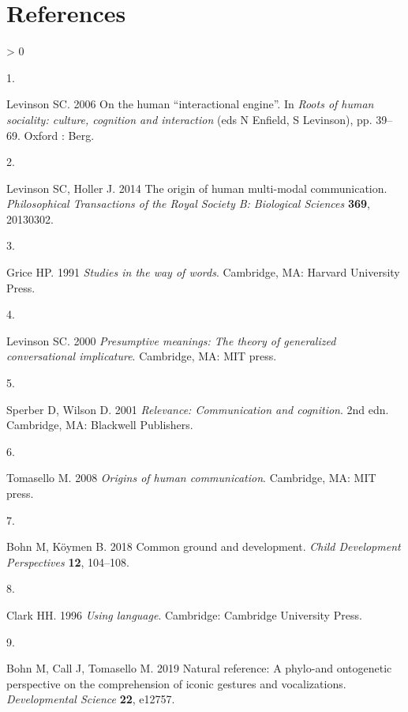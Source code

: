\documentclass[
  english,
  man,floatsintext]{apa6}
\newlength{\cslhangindent}
\newlength{\csllabelwidth}
\newenvironment{CSLReferences}[2] %
 {%
  \setlength{\parindent}{0pt}
  \ifodd #1 \everypar{\setlength{\hangindent}{\cslhangindent}}\ignorespaces\fi
  \ifnum #2 > 0
  \setlength{\parskip}{#2\baselineskip}
  \fi
 }%
 {}
\newcommand{\CSLLeftMargin}[1]{\parbox[t]{\csllabelwidth}{#1}}
\newcommand{\CSLRightInline}[1]{\parbox[t]{\linewidth - \csllabelwidth}{#1}\break}
\begin{document}
\newpage

\hypertarget{references}{%
\section{References}\label{references}}

\begingroup
\setlength{\parindent}{-0.5in}
\setlength{\leftskip}{0.5in}

\hypertarget{refs}{}
\begin{CSLReferences}{0}{0}
\leavevmode\hypertarget{ref-levinson2006human}{}%
\CSLLeftMargin{1. }
\CSLRightInline{Levinson SC. 2006 On the human {``interactional engine''}. In \emph{Roots of human sociality: culture, cognition and interaction} (eds N Enfield, S Levinson), pp. 39--69. Oxford : Berg. }

\leavevmode\hypertarget{ref-levinson2014origin}{}%
\CSLLeftMargin{2. }
\CSLRightInline{Levinson SC, Holler J. 2014 The origin of human multi-modal communication. \emph{Philosophical Transactions of the Royal Society B: Biological Sciences} \textbf{369}, 20130302.}

\leavevmode\hypertarget{ref-grice1991studies}{}%
\CSLLeftMargin{3. }
\CSLRightInline{Grice HP. 1991 \emph{Studies in the way of words}. Cambridge, MA: Harvard University Press. }

\leavevmode\hypertarget{ref-levinson2000presumptive}{}%
\CSLLeftMargin{4. }
\CSLRightInline{Levinson SC. 2000 \emph{Presumptive meanings: The theory of generalized conversational implicature}. Cambridge, MA: MIT press. }

\leavevmode\hypertarget{ref-sperber2001relevance}{}%
\CSLLeftMargin{5. }
\CSLRightInline{Sperber D, Wilson D. 2001 \emph{Relevance: Communication and cognition}. 2nd edn. Cambridge, MA: Blackwell Publishers. }

\leavevmode\hypertarget{ref-tomasello2008origins}{}%
\CSLLeftMargin{6. }
\CSLRightInline{Tomasello M. 2008 \emph{Origins of human communication}. Cambridge, MA: MIT press. }

\leavevmode\hypertarget{ref-bohn2018common}{}%
\CSLLeftMargin{7. }
\CSLRightInline{Bohn M, Köymen B. 2018 Common ground and development. \emph{Child Development Perspectives} \textbf{12}, 104--108.}

\leavevmode\hypertarget{ref-clark1996using}{}%
\CSLLeftMargin{8. }
\CSLRightInline{Clark HH. 1996 \emph{Using language}. Cambridge: Cambridge University Press. }

\leavevmode\hypertarget{ref-bohn2019natural}{}%
\CSLLeftMargin{9. }
\CSLRightInline{Bohn M, Call J, Tomasello M. 2019 Natural reference: A phylo-and ontogenetic perspective on the comprehension of iconic gestures and vocalizations. \emph{Developmental Science} \textbf{22}, e12757.}


\end{CSLReferences}
\end{document}
